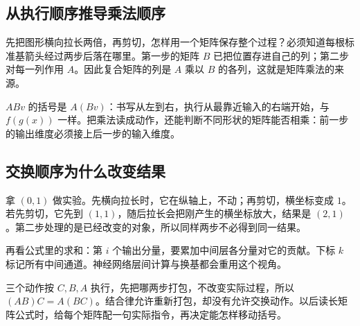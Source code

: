\subsection*{从执行顺序推导乘法顺序}
先把图形横向拉长两倍，再剪切，怎样用一个矩阵保存整个过程？必须知道每根标准基箭头经过两步后落在哪里。第一步的矩阵 $B$ 已把位置存进自己的列；第二步对每一列作用 $A$。因此复合矩阵的列是 $A$ 乘以 $B$ 的各列，这就是矩阵乘法的来源。

$ABv$ 的括号是 $A(Bv)$：书写从左到右，执行从最靠近输入的右端开始，与 $f(g(x))$ 一样。把乘法读成动作，还能判断不同形状的矩阵能否相乘：前一步的输出维度必须接上后一步的输入维度。

\subsection*{交换顺序为什么改变结果}
拿 $(0,1)$ 做实验。先横向拉长时，它在纵轴上，不动；再剪切，横坐标变成 $1$。若先剪切，它先到 $(1,1)$，随后拉长会把刚产生的横坐标放大，结果是 $(2,1)$。第二步处理的是已经改变的对象，所以同样两步不必得到同一结果。

再看公式里的求和：第 $i$ 个输出分量，要累加中间层各分量对它的贡献。下标 $k$ 标记所有中间通道。神经网络层间计算与换基都会重用这个视角。

三个动作按 $C,B,A$ 执行，先把哪两步打包，不改变实际过程，所以 $(AB)C=A(BC)$。结合律允许重新打包，却没有允许交换动作。以后读长矩阵公式时，给每个矩阵配一句实际指令，再决定能怎样移动括号。
